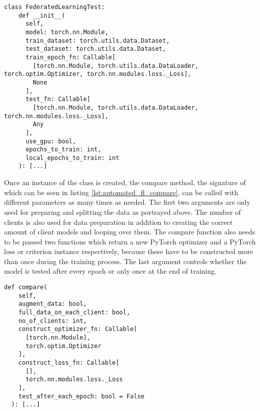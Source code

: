 \begin{lstlisting}[language=CustomPython, style=colorEX, caption=Automated federation learning class initialization, captionpos=t, label=lst:automated_fl_init]
  class FederatedLearningTest:
    def __init__(
      self,
      model: torch.nn.Module,
      train_dataset: torch.utils.data.Dataset,
      test_dataset: torch.utils.data.Dataset,
      train_epoch_fn: Callable[
        [torch.nn.Module, torch.utils.data.DataLoader, torch.optim.Optimizer, torch.nn.modules.loss._Loss], 
        None
      ], 
      test_fn: Callable[
        [torch.nn.Module, torch.utils.data.DataLoader, torch.nn.modules.loss._Loss],
        Any
      ],
      use_gpu: bool,
      epochs_to_train: int,
      local_epochs_to_train: int
    ): [...]
\end{lstlisting}

Once an instance of the class is created, the compare method, the signature of which can be seen in listing \ref{lst:automated_fl_compare}, can be called with different parameters as many times as needed. The first two arguments are only used for preparing and splitting the data as portrayed above. The number of clients is also used for data preparation in addition to creating the correct amount of client models and looping over them. The compare function also needs to be passed two functions which return a new PyTorch optimizer and a PyTorch loss or criterion instance respectively, because these have to be constructed more than once during the training process. The last argument controls whether the model is tested after every epoch or only once at the end of training.

\begin{lstlisting}[language=CustomPython, style=colorEX, caption=Automated federation learning compare method input, captionpos=t, label=lst:automated_fl_compare]
  def compare(
    self,
    augment_data: bool,
    full_data_on_each_client: bool,
    no_of_clients: int,
    construct_optimizer_fn: Callable[
      [torch.nn.Module],
      torch.optim.Optimizer
    ],
    construct_loss_fn: Callable[
      [],
      torch.nn.modules.loss._Loss
    ],
    test_after_each_epoch: bool = False
  ): [...]
\end{lstlisting}

